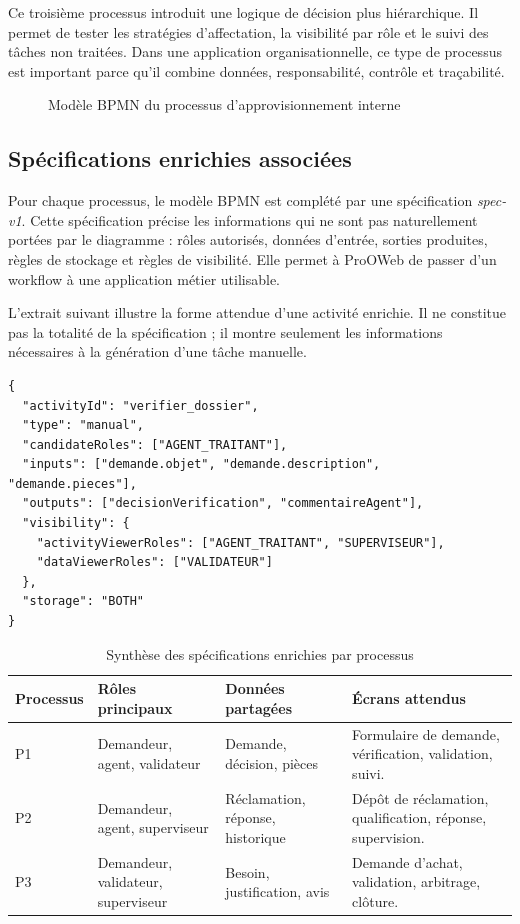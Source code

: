 Ce troisième processus introduit une logique de décision plus hiérarchique. Il permet de tester les stratégies d'affectation, la visibilité par rôle et le suivi des tâches non traitées. Dans une application organisationnelle, ce type de processus est important parce qu'il combine données, responsabilité, contrôle et traçabilité.

\begin{figure}[H]
\centering
{}
\caption{Modèle BPMN du processus d'approvisionnement interne}
\label{fig:chap4-bpmn-approvisionnement}
\end{figure}

\subsection{Spécifications enrichies associées}

Pour chaque processus, le modèle BPMN est complété par une spécification \textit{spec-v1}. Cette spécification précise les informations qui ne sont pas naturellement portées par le diagramme : rôles autorisés, données d'entrée, sorties produites, règles de stockage et règles de visibilité. Elle permet à ProOWeb de passer d'un workflow à une application métier utilisable.

L'extrait suivant illustre la forme attendue d'une activité enrichie. Il ne constitue pas la totalité de la spécification ; il montre seulement les informations nécessaires à la génération d'une tâche manuelle.

\begin{lstlisting}[caption={Exemple simplifié d'activité enrichie pour le cas d'étude},label={lst:chap4-exemple-spec}]
{
  "activityId": "verifier_dossier",
  "type": "manual",
  "candidateRoles": ["AGENT_TRAITANT"],
  "inputs": ["demande.objet", "demande.description", "demande.pieces"],
  "outputs": ["decisionVerification", "commentaireAgent"],
  "visibility": {
    "activityViewerRoles": ["AGENT_TRAITANT", "SUPERVISEUR"],
    "dataViewerRoles": ["VALIDATEUR"]
  },
  "storage": "BOTH"
}
\end{lstlisting}

\begin{table}[H]
\centering
\small
\caption{Synthèse des spécifications enrichies par processus}
\label{tab:chap4-synthese-specs}
\begin{tabular}{p{2.5cm}p{3.5cm}p{3.0cm}p{4.6cm}}
\hline
\textbf{Processus} & \textbf{Rôles principaux} & \textbf{Données partagées} & \textbf{Écrans attendus} \\
\hline
P1 & Demandeur, agent, validateur & Demande, décision, pièces & Formulaire de demande, vérification, validation, suivi. \\
P2 & Demandeur, agent, superviseur & Réclamation, réponse, historique & Dépôt de réclamation, qualification, réponse, supervision. \\
P3 & Demandeur, validateur, superviseur & Besoin, justification, avis & Demande d'achat, validation, arbitrage, clôture. \\
\hline
\end{tabular}
\end{table}

